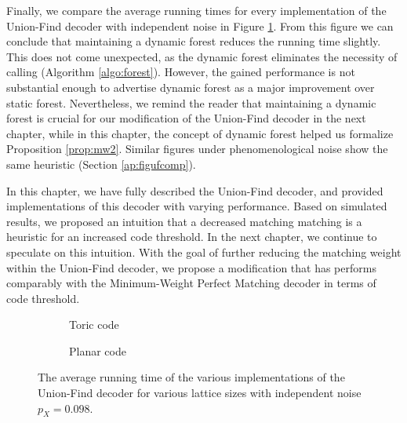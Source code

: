 Finally, we compare the average running times for every implementation of the Union-Find decoder with independent noise in Figure \ref{fig:tcomp_uf_2d}. From this figure we can conclude that maintaining a dynamic forest reduces the running time slightly. This does not come unexpected, as the dynamic forest eliminates the necessity of calling  (Algorithm \ref{algo:forest}). However, the gained performance is not substantial enough to advertise dynamic forest as a major improvement over static forest. Nevertheless, we remind the reader that maintaining a dynamic forest is crucial for our modification of the Union-Find decoder in the next chapter, while in this chapter, the concept of dynamic forest helped us formalize Proposition \ref{prop:mw2}. Similar figures under phenomenological noise show the same heuristic (Section \ref{ap:figufcomp}).

\vspace{1em}
In this chapter, we have fully described the Union-Find decoder, and provided implementations of this decoder with varying performance. Based on simulated results, we proposed an intuition that a decreased matching matching is a heuristic for an increased code threshold. In the next chapter, we continue to speculate on this intuition. With the goal of further reducing the matching weight within the Union-Find decoder, we propose a modification that has performs comparably with the Minimum-Weight Perfect Matching decoder in terms of code threshold. 

\begin{figure}[htbp]
  \centering
  \begin{subfigure}[b]{0.49\textwidth}
      
      \caption{Toric code}
  \end{subfigure}
  \begin{subfigure}[b]{0.49\textwidth}
      
      \caption{Planar code}
  \end{subfigure}
  \caption{The average running time of the various implementations of the Union-Find decoder for various lattice sizes  with independent noise $p_X=0.098$.}
  \label{fig:tcomp_uf_2d}
\end{figure}